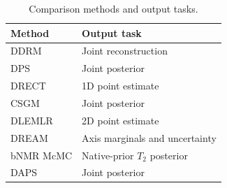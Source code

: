 \begin{table}[t]
\centering
\caption{Comparison methods and output tasks.}\label{tab:published-baselines}
\small
\begin{tabular}{@{}ll@{}}
\toprule
Method & Output task\\
\midrule
DDRM & Joint reconstruction\\
DPS & Joint posterior\\
DRECT & 1D point estimate\\
CSGM & Joint posterior\\
DLEMLR & 2D point estimate\\
DREAM & Axis marginals and uncertainty\\
bNMR McMC & Native-prior $T_2$ posterior\\
DAPS & Joint posterior\\
\bottomrule
\end{tabular}
\end{table}
